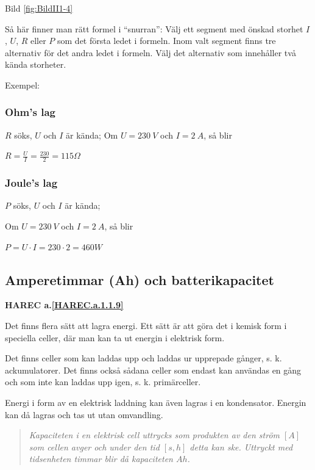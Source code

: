 Bild \ref{fig:BildII1-4}

Så här finner man rätt formel i ``snurran'':
Välj ett segment med önskad storhet \(I\), \(U\), \(R\) eller \(P\) som det första
ledet i formeln. Inom valt segment finns tre alternativ för det andra
ledet i formeln. Välj det alternativ som innehåller två kända storheter.

Exempel:

\subsubsection{Ohm's lag}

\(R\) söks, \(U\) och \(I\) är kända;
Om \(U = 230\ V\) och \(I = 2\ A\), så blir

\(R=\frac{U}{I}=\frac{230}{2}=115 \Omega\)

\subsubsection{Joule's lag}

\(P\) söks, \(U\) och \(I\) är kända;

Om \(U = 230\ V\) och \(I = 2\ A\), så blir

\(P = U \cdot I = 230 \cdot 2 = 460 W\)

\subsection{Amperetimmar (Ah) och batterikapacitet}
\textbf{HAREC a.\ref{HAREC.a.1.1.9}\label{myHAREC.a.1.1.9}}

Det finns flera sätt att lagra energi. Ett sätt är att göra det i kemisk form i
speciella celler, där man kan ta ut energin i elektrisk form.

Det finns celler som kan laddas upp och laddas ur upprepade gånger, s. k.
ackumulatorer.
Det finns också sådana celler som endast kan användas en gång och som inte
kan laddas upp igen, s. k. primärceller.

Energi i form av en elektrisk laddning kan även lagras i en kondensator.
Energin kan då lagras och tas ut utan omvandling.

\begin{quote}\emph{
Kapaciteten i en elektrisk cell uttrycks som produkten av den ström \([A]\) som
cellen avger och under den tid \([s, h]\) detta kan ske.
Uttryckt med tidsenheten timmar blir då kapaciteten \(Ah\).
}\end{quote}

